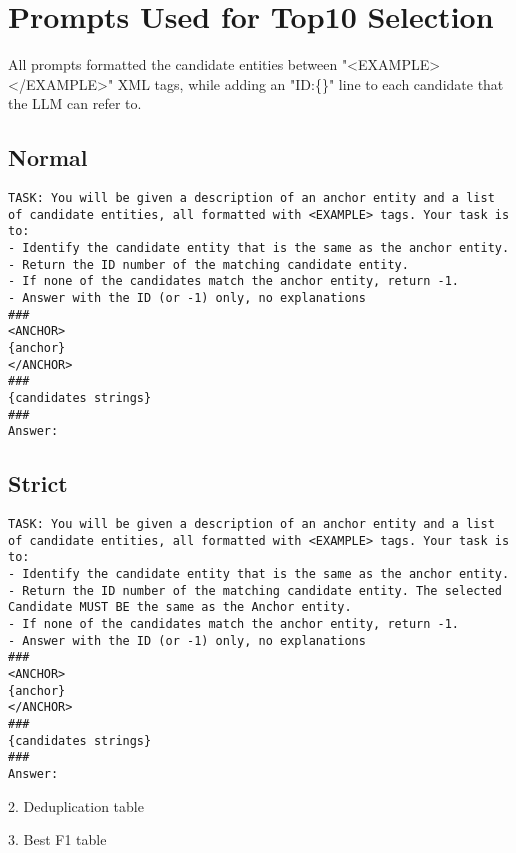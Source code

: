 \documentclass[11pt]{article}
\begin{document}
\section{Prompts Used for Top10 Selection}
All prompts formatted the candidate entities between "<EXAMPLE></EXAMPLE>" XML tags, while adding an "ID:\{\}" line to each candidate that the LLM can refer to.  

\subsection{Normal}

\begin{lstlisting}[basicstyle=\ttfamily\footnotesize]
TASK: You will be given a description of an anchor entity and a list of candidate entities, all formatted with <EXAMPLE> tags. Your task is to:
- Identify the candidate entity that is the same as the anchor entity.
- Return the ID number of the matching candidate entity.
- If none of the candidates match the anchor entity, return -1.
- Answer with the ID (or -1) only, no explanations
###
<ANCHOR>
{anchor}
</ANCHOR>
###
{candidates strings}
###
Answer:
\end{lstlisting}

\subsection{Strict}
\begin{lstlisting}[basicstyle=\ttfamily\footnotesize]
TASK: You will be given a description of an anchor entity and a list of candidate entities, all formatted with <EXAMPLE> tags. Your task is to:
- Identify the candidate entity that is the same as the anchor entity.
- Return the ID number of the matching candidate entity. The selected Candidate MUST BE the same as the Anchor entity. 
- If none of the candidates match the anchor entity, return -1.
- Answer with the ID (or -1) only, no explanations
###
<ANCHOR>
{anchor}
</ANCHOR>
###
{candidates strings}
###
Answer:
\end{lstlisting}

2. Deduplication table

3. Best F1 table
\end{document}
